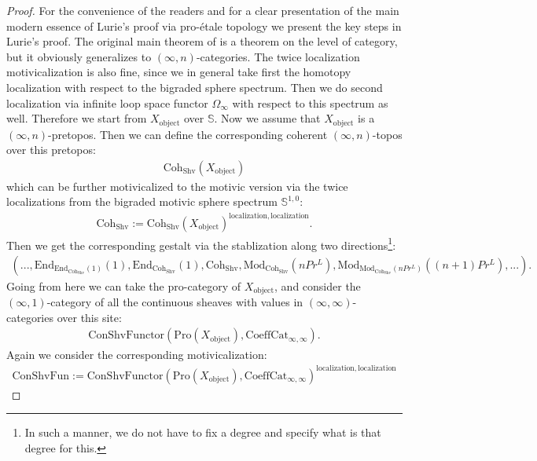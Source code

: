 \documentclass[12pt]{article}
\theoremstyle{definition}
\begin{document}
\begin{proof}
For the convenience of the readers and for a clear presentation of the main modern essence of Lurie's proof via pro-\'etale topology we present the key steps in Lurie's proof. The original main theorem of \cite{5Lu3} is a theorem on the level of category, but it obviously generalizes to $(\infty,n)$-categories. The twice localization motivicalization is also fine, since we in general take first the homotopy localization with respect to the bigraded sphere spectrum. Then we do second localization via infinite loop space functor $\Omega_\infty$ with respect to this spectrum as well. Therefore we start from $X_\mathrm{object}$ over $\mathbb{S}$. Now we assume that $X_\mathrm{object}$ is a $(\infty,n)$-pretopos. Then we can define the corresponding coherent $(\infty,n)$-topos over this pretopos:
\begin{align}
\mathrm{Coh}_{\mathrm{Shv}}(X_\mathrm{object})
\end{align}
which can be further motivicalized to the motivic version via the twice localizations from the bigraded motivic sphere spectrum $\mathbb{S}^{1,0}$:
\begin{align}
\mathrm{Coh}_\mathrm{Shv}:=\mathrm{Coh}_{\mathrm{Shv}}(X_\mathrm{object})^\mathrm{localization, localization}.
\end{align}
Then we get the corresponding gestalt via the stablization along two directions\footnote{In such a manner, we do not have to fix a degree and specify what is that degree for this.}:
\begin{align}
(...,\mathrm{End}_{\mathrm{End}_{\mathrm{Coh}_\mathrm{Shv}}(1)}(1),\mathrm{End}_{\mathrm{Coh}_\mathrm{Shv}}(1),\mathrm{Coh}_\mathrm{Shv},\mathrm{Mod}_{\mathrm{Coh}_\mathrm{Shv}}(nPr^L),\mathrm{Mod}_{\mathrm{Mod}_{\mathrm{Coh}_\mathrm{Shv}}(nPr^L)}((n+1)Pr^L),...).
\end{align}
Going from here we can take the pro-category of $X_\mathrm{object}$, and consider the $(\infty,1)$-category of all the continuous sheaves with values in $(\infty,\infty)$-categories over this site:
\begin{align}
\mathrm{ConShvFunctor}(\mathrm{Pro}(X_\mathrm{object}),\mathrm{CoeffCat}_{\infty,\infty}).
\end{align}
Again we consider the corresponding motivicalization:
\begin{align}
\mathrm{ConShvFun}:=\mathrm{ConShvFunctor}(\mathrm{Pro}(X_\mathrm{object}),\mathrm{CoeffCat}_{\infty,\infty})^\mathrm{localization,localization}
\end{align}

\end{proof}
\end{document}

